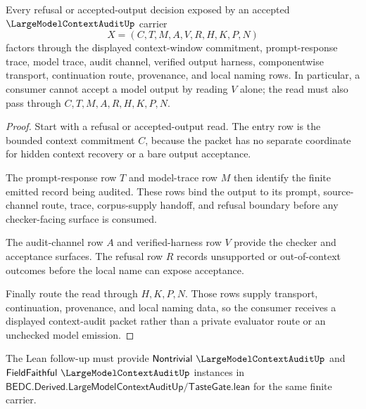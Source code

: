 \begin{theorem}
\label{thm:large-model-context-audit-refusal-factorization}
Every refusal or accepted-output decision exposed by an accepted $\LargeModelContextAuditUp$ carrier
$$
X=(C,T,M,A,V,R,H,K,P,N)
$$
factors through the displayed context-window commitment, prompt-response trace, model trace, audit channel, verified output harness, componentwise transport, continuation route, provenance, and local naming rows. In particular, a consumer cannot accept a model output by reading $V$ alone; the read must also pass through $C,T,M,A,R,H,K,P,N$.
\end{theorem}
\begin{proof}
Start with a refusal or accepted-output read. The entry row is the bounded context commitment $C$, because the packet has no separate coordinate for hidden context recovery or a bare output acceptance.

The prompt-response row $T$ and model-trace row $M$ then identify the finite emitted record being audited. These rows bind the output to its prompt, source-channel route, trace, corpus-supply handoff, and refusal boundary before any checker-facing surface is consumed.

The audit-channel row $A$ and verified-harness row $V$ provide the checker and acceptance surfaces. The refusal row $R$ records unsupported or out-of-context outcomes before the local name can expose acceptance.

Finally route the read through $H,K,P,N$. Those rows supply transport, continuation, provenance, and local naming data, so the consumer receives a displayed context-audit packet rather than a private evaluator route or an unchecked model emission.
\end{proof}



The Lean follow-up must provide $\mathsf{Nontrivial}\ \LargeModelContextAuditUp$ and $\mathsf{FieldFaithful}\ \LargeModelContextAuditUp$ instances in $\mathsf{BEDC.Derived.LargeModelContextAuditUp/TasteGate.lean}$ for the same finite carrier.

